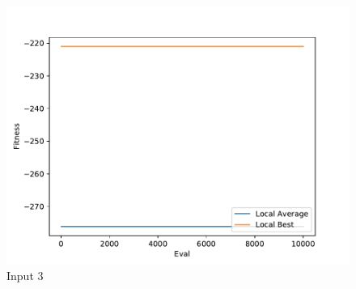 \documentclass{standalone}
\begin{document}
\begin{figure}[!htb]
	\caption{Input 3}
	\label{fig:graph_3008}
	\includegraphics[width=\textwidth]{../graphs/graphs/3008.pdf}
\end{figure}
\end{document}
